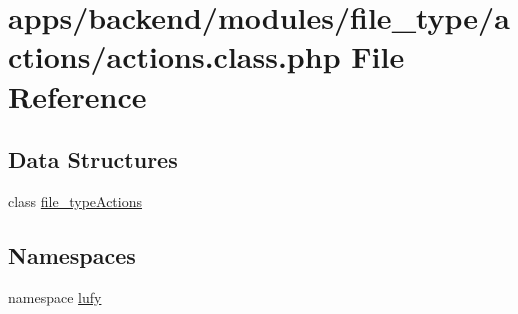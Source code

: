 \hypertarget{backend_2modules_2file__type_2actions_2actions_8class_8php}{\section{apps/backend/modules/file\-\_\-type/actions/actions.class.\-php File Reference}
\label{backend_2modules_2file__type_2actions_2actions_8class_8php}
}
\subsection*{Data Structures}
\begin{DoxyCompactItemize}
\item 
class \hyperlink{classfile__type_actions}{file\-\_\-type\-Actions}
\end{DoxyCompactItemize}
\subsection*{Namespaces}
\begin{DoxyCompactItemize}
\item 
namespace \hyperlink{namespacelufy}{lufy}
\end{DoxyCompactItemize}
